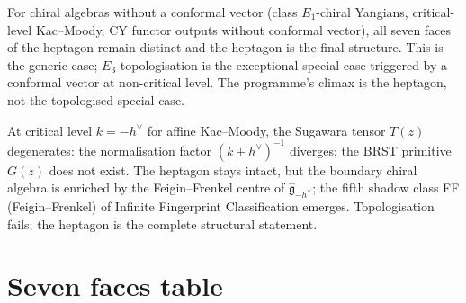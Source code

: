 \begin{remark}
\label{rem:heptagon-survives-generic}
For chiral algebras without a conformal vector (class $E_1$-chiral
Yangians, critical-level Kac--Moody, CY functor outputs without
conformal vector), all seven faces of the heptagon remain distinct
and the heptagon is the final structure. This is the generic case;
$E_3$-topologisation is the exceptional special case triggered by a
conformal vector at non-critical level. The programme's climax is
the heptagon, not the topologised special case.
\end{remark}

\begin{remark}\label{rem:heptagon-critical}
At critical level $k=-h^{\vee}$ for affine Kac--Moody, the Sugawara
tensor $T(z)$ degenerates: the normalisation factor
$(k+h^{\vee})^{-1}$ diverges; the BRST primitive $G(z)$ does not
exist. The heptagon stays intact, but the boundary chiral algebra
is enriched by the Feigin--Frenkel centre of
$\hat{\mathfrak{g}}_{-h^{\vee}}$; the fifth shadow class FF
(Feigin--Frenkel) of Infinite Fingerprint Classification emerges.
Topologisation fails; the heptagon is the complete structural
statement.
\end{remark}

\section{Seven faces table}
\label{sec:heptagon-summary}

